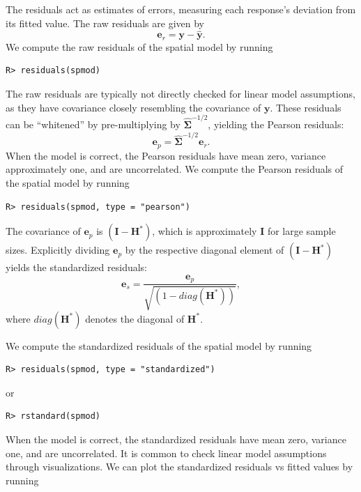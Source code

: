 \documentclass{article}
\begin{document}
The residuals act as estimates of errors, measuring each response's
deviation from its fitted value. The raw residuals are given by
\begin{equation*}
  \mathbf{e}_{r} = \mathbf{y} - \hat{\mathbf{y}}.
\end{equation*} We compute the raw residuals of the spatial model by
running

\begin{verbatim}
R> residuals(spmod)
\end{verbatim}

The raw residuals are typically not directly checked for linear model
assumptions, as they have covariance closely resembling the covariance
of \(\mathbf{y}\). These residuals can be ``whitened'' by
pre-multiplying by \(\boldsymbol{\hat{\Sigma}}^{-1/2}\), yielding the
Pearson residuals: \begin{equation*}
  \mathbf{e}_{p} = \boldsymbol{\hat{\Sigma}}^{-1/2}\mathbf{e}_{r}.
\end{equation*} When the model is correct, the Pearson residuals have
mean zero, variance approximately one, and are uncorrelated. We compute
the Pearson residuals of the spatial model by running

\begin{verbatim}
R> residuals(spmod, type = "pearson")
\end{verbatim}

The covariance of \(\mathbf{e}_{p}\) is \((\mathbf{I} - \mathbf{H}^*)\),
which is approximately \(\mathbf{I}\) for large sample sizes. Explicitly
dividing \(\mathbf{e}_{p}\) by the respective diagonal element of
\((\mathbf{I} - \mathbf{H}^*)\) yields the standardized residuals:
\begin{equation*}
  \mathbf{e}_{s} = \frac{\mathbf{e}_{p}}{\sqrt{(1 - diag(\mathbf{H}^*))}},
\end{equation*} where \(diag(\mathbf{H}^*)\) denotes the diagonal of
\(\mathbf{H}^*\).

We compute the standardized residuals of the spatial model by running

\begin{verbatim}
R> residuals(spmod, type = "standardized")
\end{verbatim}

or

\begin{verbatim}
R> rstandard(spmod)
\end{verbatim}

When the model is correct, the standardized residuals have mean zero,
variance one, and are uncorrelated. It is common to check linear model
assumptions through visualizations. We can plot the standardized
residuals vs fitted values by running
\end{document}

